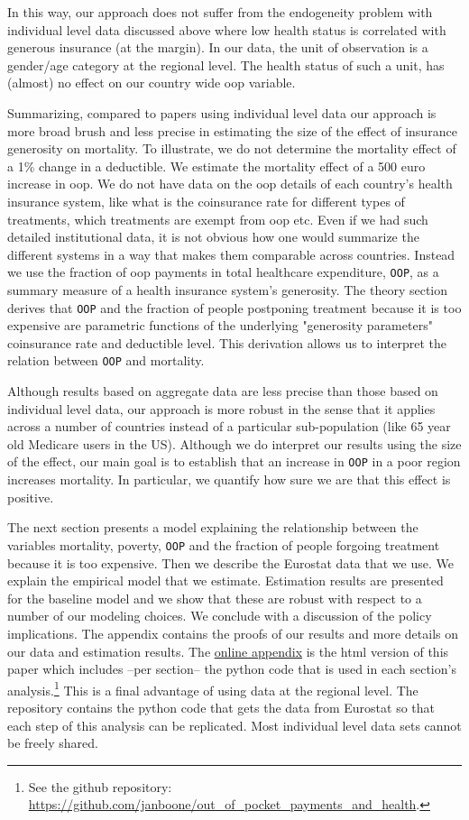 \documentclass[a4paper,12pt]{article}
\begin{document}
In this way, our approach does not suffer from the endogeneity problem with individual level data discussed above where low health status is correlated with generous insurance (at the margin). In our data, the unit of observation is a gender/age category at the regional level. The health status of such a unit, has (almost) no effect on our country wide oop variable.

Summarizing, compared to papers using individual level data our approach is more broad brush and less precise in estimating the size of the effect of insurance generosity on mortality. To illustrate, we do not determine the mortality effect of a 1\% change in a deductible. We estimate the mortality effect of a 500 euro increase in oop. We do not have data on the oop details of each country's health insurance system, like what is the coinsurance rate for different types of treatments, which treatments are exempt from oop etc. Even if we had such detailed institutional data, it is not obvious how one would summarize the different systems in a way that makes them comparable across countries. Instead we use the fraction of oop payments in total healthcare expenditure, \texttt{OOP}, as a summary measure of a health insurance system's generosity. The theory section derives that \texttt{OOP} and the fraction of people postponing treatment because it is too expensive are parametric functions of the underlying "generosity parameters" coinsurance rate and deductible level. This derivation allows us to interpret the relation between \texttt{OOP} and mortality.

Although results based on aggregate data are less precise than those based on individual level data, our approach is more robust in the sense that it applies across a number of countries instead of a particular sub-population (like 65 year old Medicare users in the US). Although we do interpret our results using the size of the effect, our main goal is to establish that an increase in \texttt{OOP} in a poor region increases mortality. In particular, we quantify how sure we are that this effect is positive.

The next section presents a model explaining the relationship between the variables mortality, poverty, \texttt{OOP} and the fraction of people forgoing treatment because it is too expensive. Then we describe the Eurostat data that we use. We explain the empirical model that we estimate. Estimation results are presented for the baseline model and we show that these are robust with respect to a number of our modeling choices. We conclude with a discussion of the policy implications. The appendix contains the proofs of our results and more details on our data and estimation results. The \href{https://janboone.github.io/out\_of\_pocket\_payments\_and\_health/index.html}{online appendix} is the html version of this paper which includes --per section-- the python code that is used in each section's analysis.\footnote{See the github repository: \url{https://github.com/janboone/out\_of\_pocket\_payments\_and\_health}.} This is a final advantage of using data at the regional level. The repository contains the python code that gets the data from Eurostat so that each step of this analysis can be replicated. Most individual level data sets cannot be freely shared.
\end{document}
